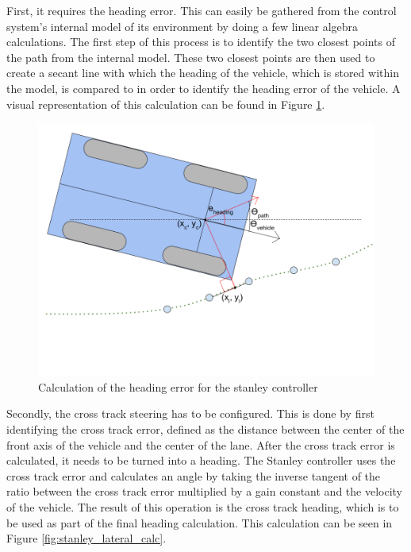 \documentclass[titlepage, draft]{article}
\begin{document}
{First, it requires the heading error. This can easily be gathered from the control system's internal model of its environment by doing a few linear algebra calculations. The first step of this process is to identify the two closest points of the path from the internal model. These two closest points are then used to create a secant line with which the heading of the vehicle, which is stored within the model, is compared to in order to identify the heading error of the vehicle. A visual representation of this calculation can be found in Figure \ref{fig:stanley_heading_calc}.

\begin{figure}
	\centering
	\includegraphics[width=5in]{stanley_heading_error}
	\caption{Calculation of the heading error for the stanley controller}
	\label{fig:stanley_heading_calc}
\end{figure}

Secondly, the cross track steering has to be configured. This is done by first identifying the cross track error, defined as the distance between the center of the front axis of the vehicle and the center of the lane. After the cross track error is calculated, it needs to be turned into a heading. The Stanley controller uses the cross track error and calculates an angle by taking the inverse tangent of the ratio between the cross track error multiplied by a gain constant and the velocity of the vehicle. The result of this operation is the cross track heading, which is to be used as part of the final heading calculation. This calculation can be seen in Figure \ref{fig:stanley_lateral_calc}.

}
\end{document}
